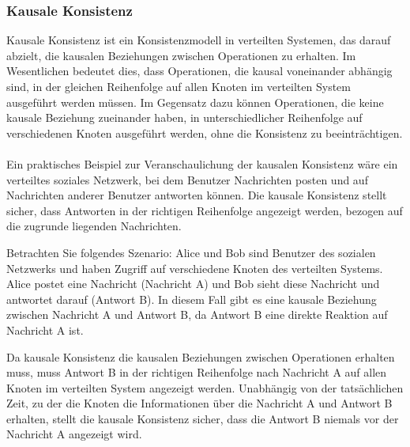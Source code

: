 \documentclass[../vs-script-first-v01.tex]{subfiles}
\begin{document}
\subsubsection{Kausale Konsistenz}
Kausale Konsistenz ist ein Konsistenzmodell in verteilten Systemen, das darauf abzielt, die kausalen Beziehungen zwischen Operationen zu erhalten. Im Wesentlichen bedeutet dies, dass Operationen, die kausal voneinander abhängig sind, in der gleichen Reihenfolge auf allen Knoten im verteilten System ausgeführt werden müssen. Im Gegensatz dazu können Operationen, die keine kausale Beziehung zueinander haben, in unterschiedlicher Reihenfolge auf verschiedenen Knoten ausgeführt werden, ohne die Konsistenz zu beeinträchtigen.
\\\\
Ein praktisches Beispiel zur Veranschaulichung der kausalen Konsistenz wäre ein verteiltes soziales Netzwerk, bei dem Benutzer Nachrichten posten und auf Nachrichten anderer Benutzer antworten können. Die kausale Konsistenz stellt sicher, dass Antworten in der richtigen Reihenfolge angezeigt werden, bezogen auf die zugrunde liegenden Nachrichten.

Betrachten Sie folgendes Szenario: Alice und Bob sind Benutzer des sozialen Netzwerks und haben Zugriff auf verschiedene Knoten des verteilten Systems. Alice postet eine Nachricht (Nachricht A) und Bob sieht diese Nachricht und antwortet darauf (Antwort B). In diesem Fall gibt es eine kausale Beziehung zwischen Nachricht A und Antwort B, da Antwort B eine direkte Reaktion auf Nachricht A ist.

Da kausale Konsistenz die kausalen Beziehungen zwischen Operationen erhalten muss, muss Antwort B in der richtigen Reihenfolge nach Nachricht A auf allen Knoten im verteilten System angezeigt werden. Unabhängig von der tatsächlichen Zeit, zu der die Knoten die Informationen über die Nachricht A und Antwort B erhalten, stellt die kausale Konsistenz sicher, dass die Antwort B niemals vor der Nachricht A angezeigt wird.
\end{document}
